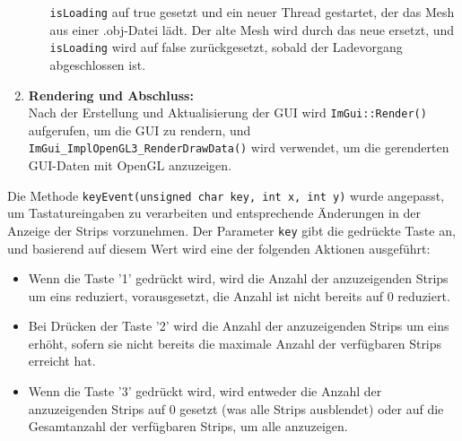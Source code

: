 \begin{enumerate}
\begin{itemize}
        \lstinline{isLoading} auf true gesetzt und ein neuer Thread gestartet, der das Mesh
        aus einer .obj-Datei lädt. Der alte Mesh wird durch das neue ersetzt,
        und \lstinline{isLoading} wird auf false zurückgesetzt, sobald der Ladevorgang
        abgeschlossen ist.
    \end{itemize} 
    \hfil \break
    \item \textbf{Rendering und Abschluss:} 
    \\ 
    Nach der Erstellung und Aktualisierung der GUI wird \lstinline{ImGui::Render()}
    aufgerufen, um die GUI zu rendern, und \lstinline{ImGui_ImplOpenGL3_RenderDrawData()}
    wird verwendet, um die gerenderten GUI-Daten mit OpenGL anzuzeigen.
\end{enumerate}
\hfil \break
Die Methode \lstinline{keyEvent(unsigned char key, int x, int y)} wurde angepasst, um
Tastatureingaben zu verarbeiten und entsprechende Änderungen in der Anzeige der
Strips vorzunehmen. Der Parameter \lstinline{key} gibt die gedrückte Taste an, und basierend
auf diesem Wert wird eine der folgenden Aktionen ausgeführt:
\\
\begin{itemize}
    \item Wenn die Taste '1' gedrückt wird, wird die Anzahl der anzuzeigenden Strips
    um eins reduziert, vorausgesetzt, die Anzahl ist nicht bereits auf 0 reduziert.
    \\
    \item Bei Drücken der Taste '2' wird die Anzahl der anzuzeigenden Strips um eins
    erhöht, sofern sie nicht bereits die maximale Anzahl der verfügbaren Strips
    erreicht hat.
    \\
    \item Wenn die Taste '3' gedrückt wird, wird entweder die Anzahl
    der anzuzeigenden Strips auf 0 gesetzt (was alle Strips ausblendet) oder auf die
    Gesamtanzahl der verfügbaren Strips, um alle anzuzeigen.
\end{itemize}
